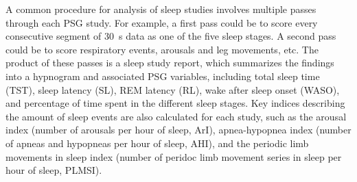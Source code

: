             A common procedure for analysis of sleep studies involves multiple passes through each PSG study.
            For example, a first pass could be to score every consecutive segment of \SI{30}{\second} data as one of the five sleep stages.
            A second pass could be to score respiratory events, arousals and leg movements, etc. 
            The product of these passes is a sleep study report, which summarizes the findings into a hypnogram and associated PSG variables, including total sleep time (TST), sleep latency (SL), REM latency (RL), wake after sleep onset (WASO), and percentage of time spent in the different sleep stages.
            Key indices describing the amount of sleep events are also calculated for each study, such as the arousal index (number of arousals per hour of sleep, ArI), apnea-hypopnea index (number of apneas and hypopneas per hour of sleep, AHI), and the periodic limb movements in sleep index (number of peridoc limb movement series in sleep per hour of sleep, PLMSI). 

